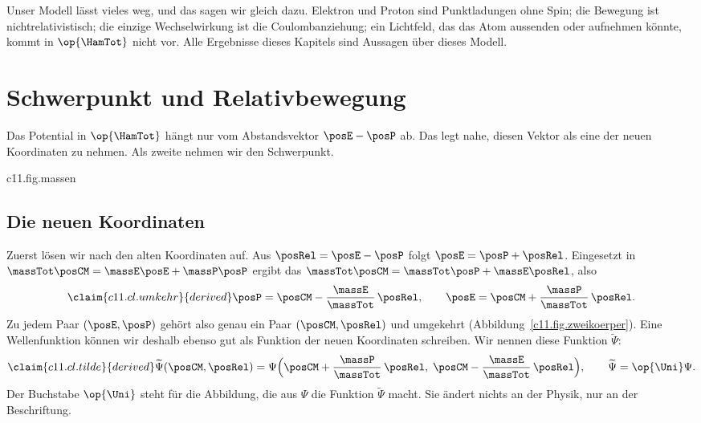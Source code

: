 Unser Modell lässt vieles weg, und das sagen wir gleich dazu. Elektron und Proton sind
Punktladungen ohne Spin; die Bewegung ist nichtrelativistisch; die einzige
Wechselwirkung ist die Coulombanziehung; ein Lichtfeld, das das Atom aussenden oder
aufnehmen könnte, kommt in $\op{\HamTot}$ nicht vor. Alle Ergebnisse dieses Kapitels sind
Aussagen über dieses Modell.

\section{Schwerpunkt und Relativbewegung}\label{c11.s2}

Das Potential in $\op{\HamTot}$ hängt nur vom Abstandsvektor $\posE - \posP$ ab. Das legt
nahe, diesen Vektor als eine der neuen Koordinaten zu nehmen. Als zweite nehmen wir den
Schwerpunkt.



\begin{tpcfigure}{c11.fig.massen}
  \caption{Wo der Schwerpunkt auf der Strecke vom Proton zum Elektron liegt: nach  im Abstand $(\massE/\massTot)\,\rad$ vom Proton. Bei gleichen Massen ist das die Mitte, beim Massenverhältnis aus Abbildung~\ref{c11.fig.zweikoerper} ein Viertel der Strecke. Im Wasserstoffatom ist das Proton so viel schwerer als das Elektron, dass der Schwerpunkt im Maßstab dieses Bildes mit dem Proton zusammenfällt.}
\end{tpcfigure}

\subsection{Die neuen Koordinaten}\label{c11.s2.1}

Zuerst lösen wir nach den alten Koordinaten auf. Aus $\posRel = \posE - \posP$ folgt
$\posE = \posP + \posRel$. Eingesetzt in
$\massTot\posCM = \massE\posE + \massP\posP$ ergibt das
$\massTot\posCM = \massTot\posP + \massE\posRel$, also
\begin{equation}\label{c11.eq.umkehr}\claim{c11.cl.umkehr}{derived}
  \posP = \posCM - \frac{\massE}{\massTot}\,\posRel,
  \qquad
  \posE = \posCM + \frac{\massP}{\massTot}\,\posRel.
\end{equation}
Zu jedem Paar $(\posE, \posP)$ gehört also genau ein Paar $(\posCM, \posRel)$ und
umgekehrt (Abbildung~\ref{c11.fig.zweikoerper}). Eine Wellenfunktion können wir deshalb
ebenso gut als Funktion der neuen Koordinaten schreiben. Wir nennen diese Funktion
$\widetilde{\Psi}$:
\begin{equation}\label{c11.eq.tilde}\claim{c11.cl.tilde}{derived}
  \widetilde{\Psi}(\posCM, \posRel)
  = \Psi\Bigl(\posCM + \frac{\massP}{\massTot}\,\posRel,\;
              \posCM - \frac{\massE}{\massTot}\,\posRel\Bigr),
  \qquad
  \widetilde{\Psi} = \op{\Uni}\Psi.
\end{equation}
Der Buchstabe $\op{\Uni}$ steht für die Abbildung, die aus $\Psi$ die Funktion
$\widetilde{\Psi}$ macht. Sie ändert nichts an der Physik, nur an der Beschriftung.

